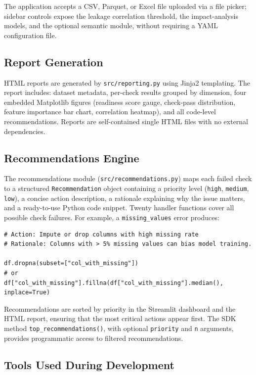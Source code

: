 \documentclass[12pt,a4paper]{report}
\begin{document}
The application accepts a CSV, Parquet, or Excel file uploaded via a file picker; sidebar
controls expose the leakage correlation threshold, the impact-analysis models, and the
optional semantic module, without requiring a YAML configuration file.

\subsection{Report Generation}

HTML reports are generated by \texttt{src/reporting.py} using Jinja2 templating.
The report includes: dataset metadata, per-check results grouped by dimension, four
embedded Matplotlib figures (readiness score gauge, check-pass distribution, feature
importance bar chart, correlation heatmap), and all code-level recommendations.
Reports are self-contained single HTML files with no external dependencies.

\subsection{Recommendations Engine}

The recommendations module (\texttt{src/recommendations.py}) maps each failed check to
a structured \texttt{Recommendation} object containing a priority level (\texttt{high},
\texttt{medium}, \texttt{low}), a concise action description, a rationale explaining why
the issue matters, and a ready-to-use Python code snippet.  Twenty handler functions cover
all possible check failures.  For example, a \texttt{missing\_values} error produces:

\begin{lstlisting}[caption={Example recommendation for missing values.}]
# Action: Impute or drop columns with high missing rate
# Rationale: Columns with > 5% missing values can bias model training.

df.dropna(subset=["col_with_missing"])
# or
df["col_with_missing"].fillna(df["col_with_missing"].median(), inplace=True)
\end{lstlisting}

Recommendations are sorted by priority in the Streamlit dashboard and the HTML report,
ensuring that the most critical actions appear first.  The SDK method
\texttt{top\_recommendations()}, with optional \texttt{priority} and \texttt{n} arguments,
provides programmatic access to filtered recommendations.

\subsection{Tools Used During Development}
\label{sec:devtools}
\end{document}
